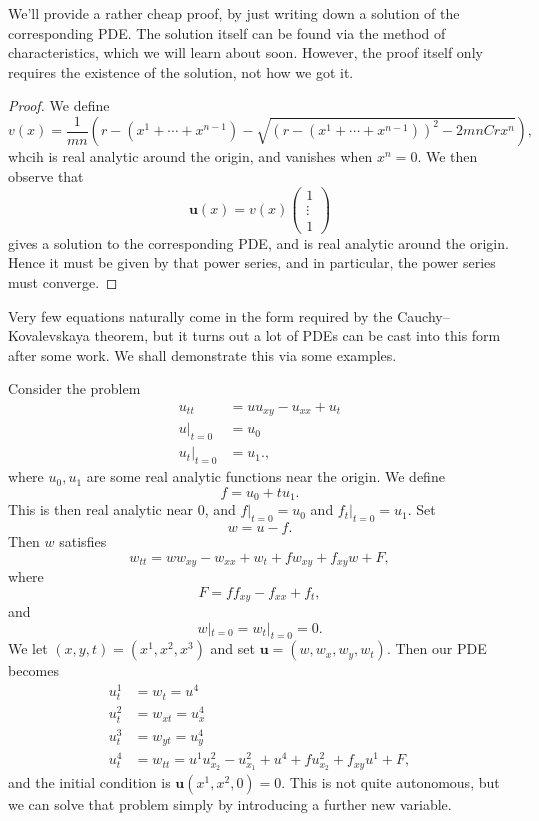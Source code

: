 \documentclass[a4paper]{article}
\begin{document}
We'll provide a rather cheap proof, by just writing down a solution of the corresponding PDE. The solution itself can be found via the method of characteristics, which we will learn about soon. However, the proof itself only requires the existence of the solution, not how we got it.
\begin{proof}
  We define
  \[
    v(x) = \frac{1}{mn} \left(r - (x^1 + \cdots + x^{n - 1}) - \sqrt{(r - (x^1 + \cdots + x^{n - 1}))^2 - 2mn Cr x^n}\right),
  \]
  whcih is real analytic around the origin, and vanishes when $x^n = 0$. We then observe that
  \[
    \mathbf{u}(x) = v(x)
    \begin{pmatrix}
      1\\\vdots\\1
    \end{pmatrix}
  \]
  gives a solution to the corresponding PDE, and is real analytic around the origin. Hence it must be given by that power series, and in particular, the power series must converge.
\end{proof}

%


Very few equations naturally come in the form required by the Cauchy--Kovalevskaya theorem, but it turns out a lot of PDEs can be cast into this form after some work. We shall demonstrate this via some examples.
\begin{eg}
  Consider the problem
  \begin{align*}
    u_{tt} &= uu_{xy} - u_{xx} + u_t\\
    u|_{t = 0} &= u_0\\
    u_t|_{t = 0} &= u_1.,
  \end{align*}
  where $u_0, u_1$ are some real analytic functions near the origin. We define
  \[
    f = u_0 + t u_1.
  \]
  This is then real analytic near $0$, and $f|_{t = 0} = u_0$ and $f_t|_{t = 0} = u_1$. Set
  \[
    w = u - f.
  \]
  Then $w$ satisfies
  \[
    w_{tt} = ww_{xy} - w_{xx} + w_t + f w_{xy} + f_{xy}w + F,
  \]
  where
  \[
    F = ff_{xy} - f_{xx} + f_t,
  \]
  and
  \[
    w|_{t = 0} = w_t|_{t = 0} = 0.
  \]
  We let $(x, y, t) = (x^1, x^2, x^3)$ and set $\mathbf{u} = (w, w_x, w_y, w_t)$. Then our PDE becomes
  \begin{align*}
    u^1_t &= w_t = u^4\\
    u^2_t &= w_{xt} = u^4_x \\
    u^3_t &= w_{yt} = u^4_y\\
    u^4_t &= w_{tt} = u^1 u^2_{x_2} - u^2_{x_1} + u^4 + f u_{x_2}^2 + f_{xy}u^1 + F,
  \end{align*}
  and the initial condition is $\mathbf{u}(x^1, x^2, 0) = 0$. This is not quite autonomous, but we can solve that problem simply by introducing a further new variable.
\end{eg}
\end{document}
